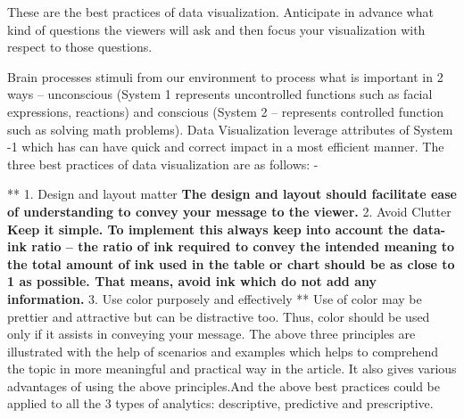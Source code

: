 \documentclass[]{book}
\theoremstyle{definition}
\theoremstyle{definition}
\theoremstyle{definition}
\theoremstyle{remark}
\begin{document}
These are the best practices of data visualization. Anticipate in
advance what kind of questions the viewers will ask and then focus your
visualization with respect to those questions.

Brain processes stimuli from our environment to process what is
important in 2 ways -- unconscious (System 1 represents uncontrolled
functions such as facial expressions, reactions) and conscious (System 2
-- represents controlled function such as solving math problems). Data
Visualization leverage attributes of System -1 which has can have quick
and correct impact in a most efficient manner. The three best practices
of data visualization are as follows: -

** 1. Design and layout matter \textbf{ The design and layout should
facilitate ease of understanding to convey your message to the viewer. }
2. Avoid Clutter \textbf{ Keep it simple. To implement this always keep
into account the data-ink ratio -- the ratio of ink required to convey
the intended meaning to the total amount of ink used in the table or
chart should be as close to 1 as possible. That means, avoid ink which
do not add any information. } 3. Use color purposely and effectively **
Use of color may be prettier and attractive but can be distractive too.
Thus, color should be used only if it assists in conveying your message.
The above three principles are illustrated with the help of scenarios
and examples which helps to comprehend the topic in more meaningful and
practical way in the article. It also gives various advantages of using
the above principles.And the above best practices could be applied to
all the 3 types of analytics: descriptive, predictive and prescriptive.
\end{document}
